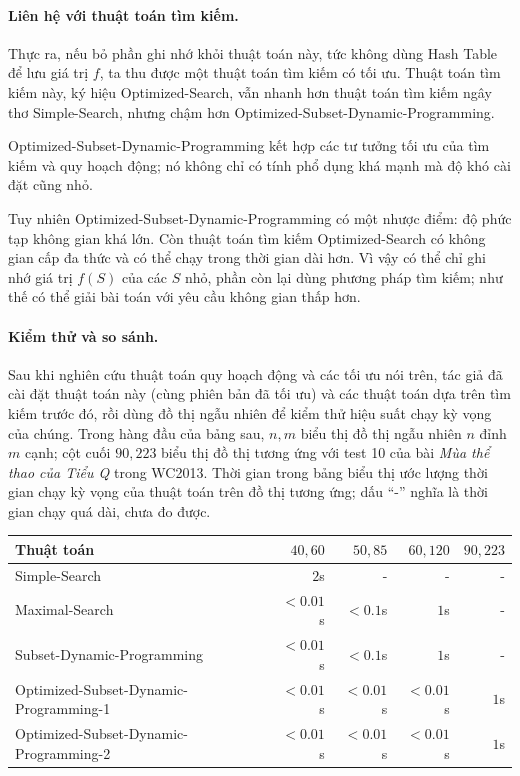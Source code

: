\documentclass[11pt]{article}
\begin{document}
\paragraph{Liên hệ với thuật toán tìm kiếm.}
Thực ra, nếu bỏ phần ghi nhớ khỏi thuật toán này, tức không dùng Hash Table để
lưu giá trị \(f\), ta thu được một thuật toán tìm kiếm có tối ưu. Thuật toán
tìm kiếm này, ký hiệu Optimized-Search, vẫn nhanh hơn thuật toán tìm kiếm ngây
thơ Simple-Search, nhưng chậm hơn Optimized-Subset-Dynamic-Programming.

Optimized-Subset-Dynamic-Programming kết hợp các tư tưởng tối ưu của tìm kiếm
và quy hoạch động; nó không chỉ có tính phổ dụng khá mạnh mà độ khó cài đặt
cũng nhỏ.

Tuy nhiên Optimized-Subset-Dynamic-Programming có một nhược điểm: độ phức tạp
không gian khá lớn. Còn thuật toán tìm kiếm Optimized-Search có không gian cấp
đa thức và có thể chạy trong thời gian dài hơn. Vì vậy có thể chỉ ghi nhớ giá
trị \(f(S)\) của các \(S\) nhỏ, phần còn lại dùng phương pháp tìm kiếm; như thế
có thể giải bài toán với yêu cầu không gian thấp hơn.

\paragraph{Kiểm thử và so sánh.}
Sau khi nghiên cứu thuật toán quy hoạch động và các tối ưu nói trên, tác giả
đã cài đặt thuật toán này (cùng phiên bản đã tối ưu) và các thuật toán dựa trên
tìm kiếm trước đó, rồi dùng đồ thị ngẫu nhiên để kiểm thử hiệu suất chạy kỳ
vọng của chúng. Trong hàng đầu của bảng sau, \(n,m\) biểu thị đồ thị ngẫu nhiên
\(n\) đỉnh \(m\) cạnh; cột cuối \(90,223\) biểu thị đồ thị tương ứng với test
10 của bài \emph{Mùa thể thao của Tiểu Q} trong WC2013. Thời gian trong bảng
biểu thị ước lượng thời gian chạy kỳ vọng của thuật toán trên đồ thị tương
ứng; dấu ``-'' nghĩa là thời gian chạy quá dài, chưa đo được.

\begin{center}
\small
\begin{tabular}{l r r r r}
\textbf{Thuật toán} & \(40,60\) & \(50,85\) & \(60,120\) & \(90,223\)\\
\hline
Simple-Search & \(2\)s & - & - & -\\
Maximal-Search & \(<0.01\)s & \(<0.1\)s & \(1\)s & -\\
Subset-Dynamic-Programming & \(<0.01\)s & \(<0.1\)s & \(1\)s & -\\
Optimized-Subset-Dynamic-Programming-1 &
  \(<0.01\)s & \(<0.01\)s & \(<0.01\)s & \(1\)s\\
Optimized-Subset-Dynamic-Programming-2 &
  \(<0.01\)s & \(<0.01\)s & \(<0.01\)s & \(1\)s
\end{tabular}
\end{center}
\end{document}
